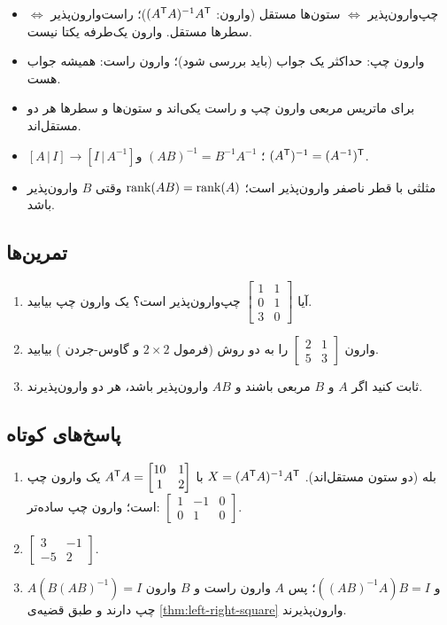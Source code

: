 \begin{summary}
\begin{itemize}
  \item چپ‌وارون‌پذیر $\iff$ ستون‌ها مستقل (وارون: $(A^{\mathsf{T}} A)^{-1}A^{\mathsf{T}}$)؛ راست‌وارون‌پذیر $\iff$ سطرها مستقل. وارون یک‌طرفه یکتا نیست.
  \item وارون چپ: حداکثر یک جواب (باید بررسی شود)؛ وارون راست: همیشه جواب هست.
  \item برای ماتریس مربعی وارون چپ و راست یکی‌اند و ستون‌ها و سطرها هر دو مستقل‌اند.
  \item $[A\,|\,I]\to[I\,|\,A^{-1}]$؛ $(AB)^{-1}=B^{-1}A^{-1}$ و $(A^{\mathsf{T}})^{-1}=(A^{-1})^{\mathsf{T}}$.
  \item مثلثی با قطر ناصفر وارون‌پذیر است؛ $\operatorname{rank}(AB)=\operatorname{rank}(A)$ وقتی $B$ وارون‌پذیر باشد.
\end{itemize}
\end{summary}

\subsection*{تمرین‌ها}
\begin{enumerate}
  \item آیا $\begin{bmatrix}1&1\\0&1\\3&0\end{bmatrix}$ چپ‌وارون‌پذیر است؟ یک وارون چپ بیابید.
  \item وارون $\begin{bmatrix}2&1\\5&3\end{bmatrix}$ را به دو روش (فرمول $2\times2$ و گاوس-جردن ) بیابید.
  \item ثابت کنید اگر $A$ و $B$ مربعی باشند و $AB$ وارون‌پذیر باشد، هر دو وارون‌پذیرند.
\end{enumerate}

\subsection*{پاسخ‌های کوتاه}
\begin{enumerate}
  \item بله (دو ستون مستقل‌اند). $X=(A^{\mathsf{T}} A)^{-1}A^{\mathsf{T}}$ با $A^{\mathsf{T}} A=\begin{bmatrix}10&1\\1&2\end{bmatrix}$ یک وارون چپ است؛ وارون چپ ساده‌تر: $\begin{bmatrix}1&-1&0\\0&1&0\end{bmatrix}$.
  \item $\begin{bmatrix}3&-1\\-5&2\end{bmatrix}$.
  \item $A(B(AB)^{-1})=I$ و $((AB)^{-1}A)B=I$؛ پس $A$ وارون راست و $B$ وارون چپ دارند و طبق قضیه‌ی \ref{thm:left-right-square} وارون‌پذیرند.
\end{enumerate}
